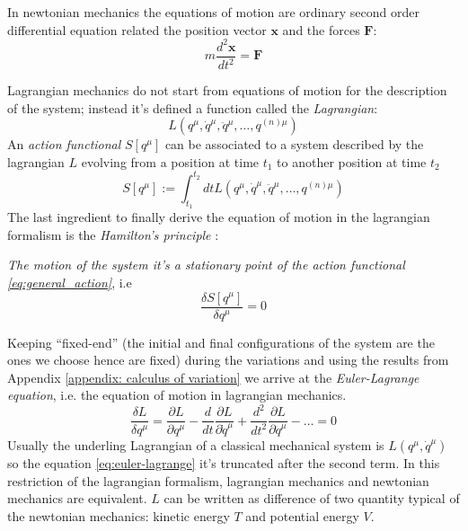 In newtonian mechanics the equations of motion are ordinary second order differential
equation related the position vector $\bm{x}$ and the forces $\bm{F}$:
\begin{equation*}
    m \frac{d^2\bm{x}}{dt^2} = \bm{F}
\end{equation*}

Lagrangian mechanics do not start from equations of motion for the description of the
system; instead it's defined a function called the \emph{Lagrangian}:
\begin{equation} \label{eq:general_lagrangian}
    L(q^{\mu}, \dot{q}^{\mu}, \ddot{q}^{\mu}, \ldots, q^{(n)\mu})
\end{equation}
An \emph{action functional} $S[q^{\mu}]$ can be associated to a system described by the
lagrangian $L$ evolving from a position at time $t_1$ to another position at time $t_2$
\begin{equation} \label{eq:general_action}
    S[q^{\mu}] := \int_{t_1}^{t_2} dt L(q^{\mu}, \dot{q}^{\mu}, \ddot{q}^{\mu}, \ldots, q^{(n)\mu})
\end{equation}
The last ingredient to finally derive the equation of motion in the lagrangian formalism
is the \emph{Hamilton's principle} \cite{Goldstein11_Ham_principle}:
\begin{displayquote}
    \emph{The motion of the system it's a stationary point of the action functional
    \eqref{eq:general_action}}, i.e
    \begin{equation*}
        \frac{\delta S[q^{\mu}]}{\delta q^{\mu}} = 0
    \end{equation*}
\end{displayquote}
Keeping ``fixed-end'' (the initial and final configurations of the system are the ones
we choose hence are fixed) during the variations and using the results from Appendix
\ref{appendix: calculus of variation} we arrive at the \emph{Euler-Lagrange equation},
i.e. the equation of motion in lagrangian mechanics.
\begin{equation} \label{eq:euler-lagrange}
    \frac{\delta L}{\delta q^{\mu}} =
    \frac{\partial L}{\partial q^{\mu}} -
    \frac{d}{dt}\frac{\partial L}{\partial \dot{q}^{\mu}} +
    \frac{d^2}{dt^2}\frac{\partial L}{\partial \ddot{q}^{\mu}} -
    \ldots = 0
\end{equation}
Usually the underling Lagrangian of a classical mechanical system is $L(q^{\mu},
\dot{q}^{\mu})$ so the equation \eqref{eq:euler-lagrange} it's truncated after the
second term. In this restriction of the lagrangian formalism, lagrangian mechanics and
newtonian mechanics are equivalent. $L$ can be written as difference of two quantity typical of
the newtonian mechanics: kinetic energy $T$ and potential energy $V$.
